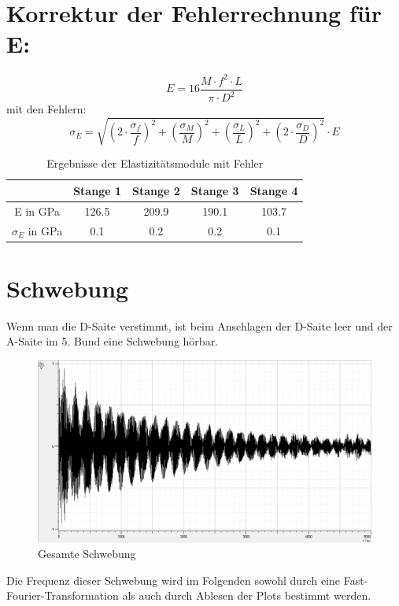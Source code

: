 \documentclass[12pt,a4paper]{article}
\author{Gruppe C14 \\ Julián Häck, Martin Koytek, Lars Wenning, Erik Zimmermann}
\begin{document}
\section{Korrektur der Fehlerrechnung für E:}
\begin{equation}
E=16 \frac{M\cdot f^2\cdot L}{\pi\cdot D^2}
\end{equation}
mit den Fehlern:
\begin{equation}
\sigma_{E}=\sqrt{(2\cdot\frac{\sigma_{f}}{f})^2+(\frac{\sigma_M}{M})^2+(\frac{\sigma_L}{L})^2+(2\cdot \frac{\sigma_D}{D})^2}\cdot E
\end{equation}

\begin{table}[H]\centering
\caption{Ergebnisse der Elastizitätsmodule mit Fehler}
\begin{tabular}{c|cccc}
 & Stange 1 & Stange 2 & Stange 3 & Stange 4 \\
\hline 
E in GPa & 126.5 & 209.9 & 190.1 & 103.7 \\ 
$\sigma_E$ in GPa & 0.1 & 0.2 & 0.2 & 0.1 \\ 
\end{tabular} 
\end{table}

\section{Schwebung}
Wenn man die D-Saite verstimmt, ist beim Anschlagen der D-Saite leer und der A-Saite im 5. Bund eine Schwebung hörbar.
\begin{figure}[H]
\centering
\includegraphics[scale=0.5]{schwebung/Schwebung_Roh.png}
\caption{Gesamte Schwebung}
\end{figure}

Die Frequenz dieser Schwebung wird im Folgenden sowohl durch eine Fast-Fourier-Transformation als auch durch Ablesen der Plots bestimmt werden.
\end{document}
